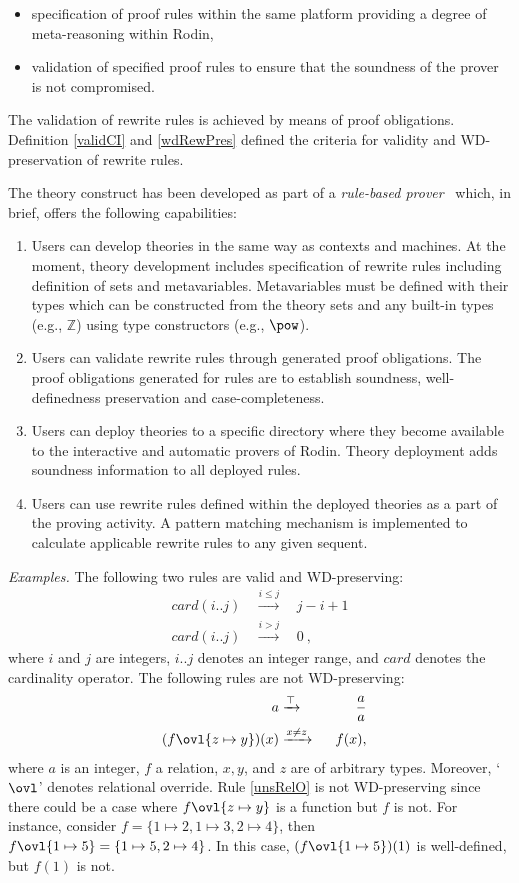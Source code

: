 \documentclass[copyright]{eptcs}
\begin{document}
\begin{itemize}
\item specification of proof rules within the same platform providing a degree of meta-reasoning within Rodin,
\item validation of specified proof rules to ensure that the soundness of the prover is not compromised.
\end{itemize}
The validation of rewrite rules is achieved by means of proof obligations. Definition \ref{validCI} and \ref{wdRewPres} defined the criteria for validity and WD-preservation of rewrite rules.
\par
The theory construct has been developed as part of a \textit{rule-based prover}~\cite{issam1984} which, in brief, offers the following capabilities:
\begin{enumerate}
\item Users can develop theories in the same way as contexts and machines. At the moment, theory development includes specification of rewrite rules including definition of sets and metavariables. Metavariables must be defined with their types which can be constructed from the theory sets and any built-in types (e.g., $\mathbb{Z}$) using type constructors (e.g., $\pow$).
\item Users can validate rewrite rules through generated proof obligations. The proof obligations generated for rules are to establish soundness, well-definedness preservation and case-completeness.
\item Users can deploy theories to a specific directory where they become available to the interactive and automatic provers of Rodin. Theory deployment adds soundness information to all deployed rules.
\item Users can use rewrite rules defined within the deployed theories as a part of the proving activity. A pattern matching mechanism is implemented to calculate applicable rewrite rules to any given sequent. 
\end{enumerate}
\vspace{2mm}
\textit{Examples.} The following two rules are valid and WD-preserving:
\begin{eqnarray}
card(i..j)~~&\xrightarrow{i \leq j}&~~j-i+1\\
card(i..j)~~&\xrightarrow{i > j}&~~0~,
\end{eqnarray}
where $i$ and $j$ are integers, $i..j$ denotes an integer range, and $card$ denotes the cardinality operator. The following rules are not WD-preserving:
\begin{eqnarray}
~~a&\xrightarrow{\top}&~~\frac{a}{a}\\
~~(f\ovl \{z\mapsto y\})(x)&\xrightarrow{x\neq z}&~~f(x)\label{unsRelO},
\end{eqnarray}
where $a$ is an integer, $f$ a relation, $x, y$, and $z$ are of arbitrary types. Moreover, `$\ovl$' denotes relational override. Rule \ref{unsRelO} is not WD-preserving since there could be a case where $f\ovl \{z\mapsto y\}$ is a function but $f$ is not. For instance, consider $f=\{1\mapsto 2, 1\mapsto 3, 2 \mapsto 4\}$, then 
$f\ovl\{1\mapsto 5\} = \{1\mapsto 5, 2 \mapsto 4\}$. In this case, $(f\ovl\{1\mapsto 5\})(1)$ is well-defined, but $f(1)$ is not.
\end{document}
